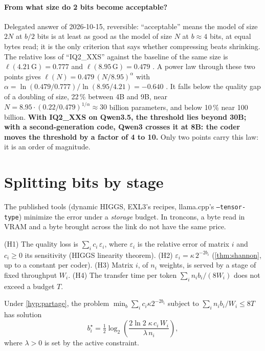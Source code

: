\paragraph{From what size do 2 bits become acceptable?} Delegated answer of 2026-10-15, reversible: \enquote{acceptable} means the model of size $2N$ at $b/2$ bits is at least as good as the model of size $N$ at $b \approx 4$ bits, at equal bytes read; it is the only criterion that says whether compressing beats shrinking. The relative loss of \enquote{IQ2\_XXS} against the baseline of the same size is $\ell(4.21\,\mathrm{G}) = 0.777$ and $\ell(8.95\,\mathrm{G}) = 0.479$ \mes. A power law through these two points gives $\ell(N) = 0.479\,(N/8.95)^{\alpha}$ with $\alpha = \ln(0.479/0.777)/\ln(8.95/4.21) = -0.640$ \calc. It falls below the quality gap of a doubling of size, 22\,\% between 4B and 9B, near $N = 8.95 \cdot (0.22/0.479)^{1/\alpha} \approx 30$ billion parameters, and below 10\,\% near 100 billion. \textbf{With IQ2\_XXS on Qwen3.5, the threshold lies beyond 30B; with a second-generation code, Qwen3 crosses it at 8B: the coder moves the threshold by a factor of 4 to 10.} Only two points carry this law: it is an order of magnitude.

\section{Splitting bits by stage}\label{sec:partage-bits}

The published tools (dynamic HIGGS, EXL3's recipes, llama.cpp's \texttt{--tensor-type}) minimize the error under a \emph{storage} budget. In troncons, a byte read in VRAM and a byte brought across the link do not have the same price.

\begin{hypothese}\label{hyp:partage}
(H1) The quality loss is $\sum_i c_i\, \varepsilon_i$, where $\varepsilon_i$ is the relative error of matrix $i$ and $c_i \ge 0$ its sensitivity (HIGGS linearity theorem). (H2) $\varepsilon_i = \kappa\, 2^{-2b_i}$ (\cref{thm:shannon}, up to a constant per coder). (H3) Matrix $i$, of $n_i$ weights, is served by a stage of fixed throughput $W_i$. (H4) The transfer time per token $\sum_i n_i b_i / (8 W_i)$ does not exceed a budget $T$.
\end{hypothese}

\begin{proposition}\label{prop:partage}
Under \cref{hyp:partage}, the problem $\min_b \sum_i c_i \kappa 2^{-2b_i}$ subject to $\sum_i n_i b_i / W_i \le 8T$ has solution
\begin{equation}\label{eq:partage}
b_i^\star = \tfrac12 \log_2\!\left(\frac{2 \ln 2 \;\kappa\, c_i \, W_i}{\lambda\, n_i}\right),
\end{equation}
where $\lambda > 0$ is set by the active constraint.
\end{proposition}

